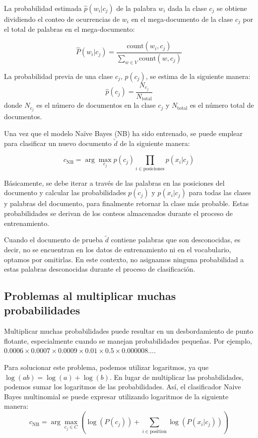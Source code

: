 \documentclass[11pt,fleqn]{book} %
\begin{document}
La probabilidad estimada $\hat{p}(w_i | c_j)$ de la palabra $w_i$ dada la clase $c_j$ se obtiene dividiendo el conteo de ocurrencias de $w_i$ en el mega-documento de la clase $c_j$ por el total de palabras en el mega-documento:

\[
\hat{P}(w_i | c_j) = \frac{{\text{count}(w_i, c_j)}}{\sum_{w\in V}{\text{count}(w, c_j)}}
\]


La probabilidad previa de una clase $c_j$, $p(c_j)$, se estima de la siguiente manera:
    \[
    \hat{p}(c_j) = \frac{N_{c_j}}{N_{\text{total}}}
    \]
donde $N_{c_j}$ es el número de documentos en la clase $c_j$ y $N_{\text{total}}$ es el número total de documentos.


Una vez que el modelo Naïve Bayes (NB) ha sido entrenado, se puede emplear para clasificar un nuevo documento $\tilde{d}$ de la siguiente manera:

\[
c_{\text{NB}} = \arg\max_{c_j} p(c_j) \prod_{i \in \text{posiciones}} p(x_i | c_j)
\]

Básicamente, se debe iterar a través de las palabras en las posiciones del documento y calcular las probabilidades $p(c_j)$ y $p(x_i | c_j)$ para todas las clases y palabras del documento, para finalmente retornar la clase más probable. Estas probabilidades se derivan de los conteos almacenados durante el proceso de entrenamiento.

Cuando el documento de prueba $\tilde{d}$ contiene palabras que son desconocidas, es decir, no se encuentran en los datos de entrenamiento ni en el vocabulario, optamos por omitirlas. En este contexto, no asignamos ninguna probabilidad a estas palabras desconocidas durante el proceso de clasificación.

\subsection{Problemas al multiplicar muchas probabilidades}

Multiplicar muchas probabilidades puede resultar en un desbordamiento de punto flotante, especialmente cuando se manejan probabilidades pequeñas. Por ejemplo, $0.0006 \times 0.0007 \times 0.0009 \times 0.01 \times 0.5 \times 0.000008 \ldots$.

Para solucionar este problema, podemos utilizar logaritmos, ya que $\log(ab) = \log(a) + \log(b)$. En lugar de multiplicar las probabilidades, podemos sumar los logaritmos de las probabilidades. Así, el clasificador Naive Bayes multinomial se puede expresar utilizando logaritmos de la siguiente manera:
\[
c_{\text{NB}} = \arg\max_{c_j \in C} \left(\log(P(c_j)) + \sum_{i \in \text{position}} \log(P(x_i | c_j))\right)
\]
\end{document}

